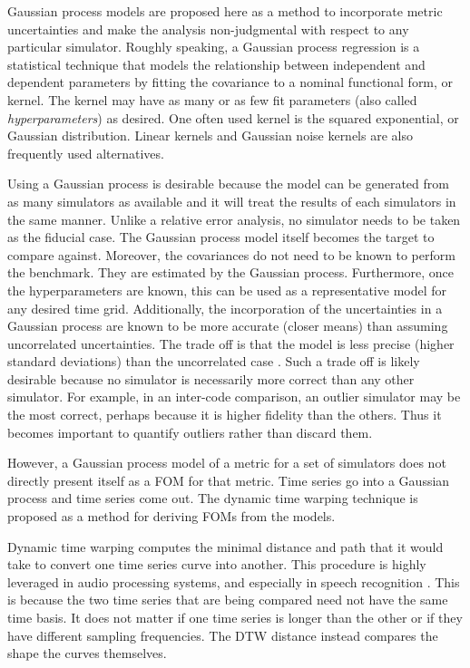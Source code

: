 Gaussian process models are proposed here as a method to incorporate 
metric uncertainties and make the analysis non-judgmental with respect to 
any particular
simulator. Roughly speaking, a Gaussian process regression is a 
statistical technique
that models the relationship between independent and dependent parameters
by fitting the covariance to a nominal functional form, or kernel.
The kernel may have as many or as few fit parameters (also called 
\emph{hyperparameters}) as desired. One often used kernel is the squared 
exponential, or Gaussian distribution. Linear kernels and Gaussian
noise kernels are also frequently used alternatives. 

Using a Gaussian process is desirable because the model can be generated
from as many simulators as available and it will treat the results of
each simulators in the same manner. Unlike a relative error analysis, no 
simulator needs to be taken as the fiducial case. The Gaussian process model 
itself becomes the target to compare against. 
Moreover, the covariances do not need to be known to perform the benchmark.
They are estimated by the Gaussian process. Furthermore, once the 
hyperparameters are known, this can be used as a representative model for 
any desired time grid. Additionally, the incorporation of the uncertainties
in a Gaussian process are known to be more accurate (closer means) than 
assuming uncorrelated uncertainties.  The trade off is that the 
model is less precise (higher standard deviations) than the uncorrelated 
case \cite{hodlr}. Such a trade off is likely desirable because no simulator 
is necessarily more correct than any other simulator. For example, 
in an inter-code comparison, an outlier simulator may be the 
most correct, perhaps because it is higher fidelity than the others. Thus it
becomes important to quantify outliers rather than discard them.

However, a Gaussian process model of a metric for a set of simulators 
does not directly present itself as a FOM for that metric. Time series go 
into a Gaussian process and time series come out. The dynamic time warping 
technique is proposed as a method for deriving FOMs from the models.  

Dynamic time warping computes the minimal distance and path that it would 
take to convert one time series curve into another. This procedure is highly 
leveraged in audio processing systems, and especially in speech recognition
\cite{myers1980performance,muda2010voice}.
This is because the two time series that are being compared need not have
the same time basis.  It does not matter if one time series is longer than 
the other or if they have different sampling frequencies. The DTW distance
instead compares the shape the curves themselves. 

